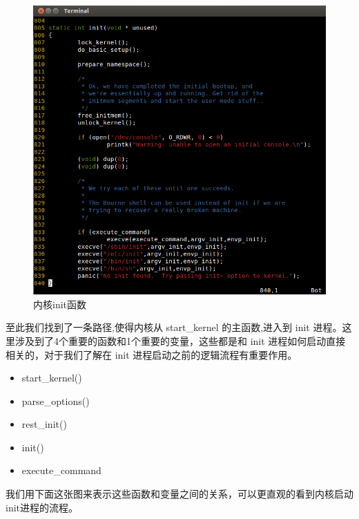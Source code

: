 \begin{figure}[htbp]
\centering
\includegraphics{./pictures/init.png}
\caption{内核init函数}
\end{figure}

至此我们找到了一条路径,使得内核从 start\_kernel 的主函数,进入到 init
进程。这里涉及到了4个重要的函数和1个重要的变量，这些都是和 init
进程如何启动直接相关的，对于我们了解在 init
进程启动之前的逻辑流程有重要作用。

\begin{itemize}
\item
  start\_kernel()
\item
  parse\_options()
\item
  rest\_init()
\item
  init()
\item
  execute\_command
\end{itemize}
我们用下面这张图来表示这些函数和变量之间的关系，可以更直观的看到内核启动init进程的流程。

